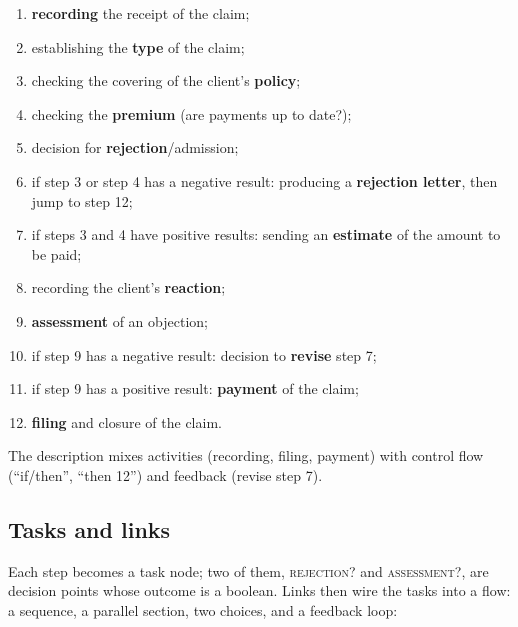 \begin{enumerate}
  \item \textbf{recording} the receipt of the claim;
  \item establishing the \textbf{type} of the claim;
  \item checking the covering of the client's \textbf{policy};
  \item checking the \textbf{premium} (are payments up to date?);
  \item decision for \textbf{rejection}/admission;
  \item if step 3 or step 4 has a negative result: producing a \textbf{rejection letter}, then jump to step 12;
  \item if steps 3 and 4 have positive results: sending an \textbf{estimate} of the amount to be paid;
  \item recording the client's \textbf{reaction};
  \item \textbf{assessment} of an objection;
  \item if step 9 has a negative result: decision to \textbf{revise} step 7;
  \item if step 9 has a positive result: \textbf{payment} of the claim;
  \item \textbf{filing} and closure of the claim.
\end{enumerate}

The description mixes activities (recording, filing, payment) with control flow (``if/then'', ``then 12'') and feedback (revise step 7).

\subsection{Tasks and links}

Each step becomes a task node; two of them, \textsc{rejection?} and \textsc{assessment?}, are decision points whose outcome is a boolean. Links then wire the tasks into a flow: a sequence, a parallel section, two choices, and a feedback loop:

